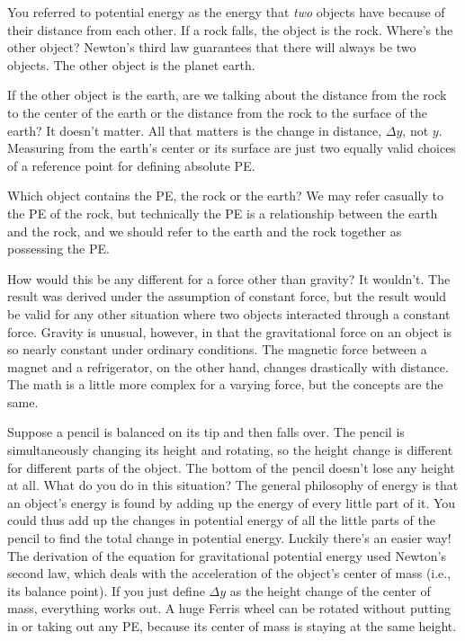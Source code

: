 \qandaquestion You referred to potential energy as the energy
that \emph{two} objects have because of their distance from
each other. If a rock falls, the object is the rock.
Where's the other object?
\qandaanswer Newton's third law guarantees that there will always
be two objects. The other object is the planet earth.

\qandaquestion If the other object is the earth, are we talking
about the distance from the rock to the center of the earth
or the distance from the rock to the surface of the earth?
\qandaanswer It doesn't matter. All that matters is the change in
distance, $\Delta y$, not $y$. Measuring from the earth's
center or its surface are just two equally valid choices of
a reference point for defining absolute PE.

\qandaquestion Which object contains the PE, the rock or the earth?
\qandaanswer We may refer casually to the PE of the rock, but
technically the PE is a relationship between the earth and
the rock, and we should refer to the earth and the rock
together as possessing the PE.

\qandaquestion How would this be any different for a force other than gravity?
\qandaanswer It wouldn't. The result was derived under the
assumption of constant force, but the result would be valid
for any other situation where two objects interacted through
a constant force. Gravity is unusual, however, in that the
gravitational force on an object is so nearly constant under
ordinary conditions. The magnetic force between a magnet and
a refrigerator, on the other hand, changes drastically with
distance. The math is a little more complex for a varying
force, but the concepts are the same.

\qandaquestion Suppose a pencil is balanced on its tip and then
falls over. The pencil is simultaneously changing its height
and rotating, so the height change is different for
different parts of the object. The bottom of the pencil
doesn't lose any height at all. What do you do in this situation?
\qandaanswer The general philosophy of energy is that an object's
energy is found by adding up the energy of every little part
of it. You could thus add up the changes in potential energy
of all the little parts of the pencil to find the total
change in potential energy. Luckily there's an easier way!
The derivation of the equation for gravitational potential
energy used Newton's second law, which deals with the
acceleration of the object's center of mass (i.e., its
balance point). If you just define $\Delta y$ as the height
change of the center of mass, everything works out. A huge
Ferris wheel can be rotated without putting in or taking out
any PE, because its center of mass is staying at the same height.

